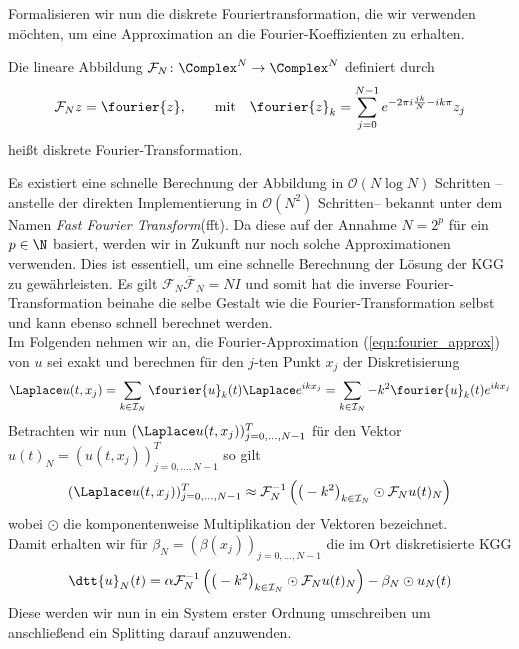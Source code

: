 Formalisieren wir nun die diskrete Fouriertransformation, die wir verwenden möchten, um eine Approximation an die Fourier-Koeffizienten zu erhalten.
\begin{mathdef}
Die lineare Abbildung $\mathcal{F}_N\colon\Complex^N\to\Complex^N$ definiert durch
\[\mathcal{F}_Nz=\fourier{z},\qquad\text{mit}\quad \fourier{z}_k=\sum_{j=0}^{N-1}e^{-2\pi i\frac{jk}{N}-ik\pi}z_j\]
heißt diskrete Fourier-Transformation.
\end{mathdef}
Es existiert eine schnelle Berechnung der Abbildung in $\mathcal{O}(N\log N)$ Schritten --anstelle der direkten Implementierung in $\mathcal{O}(N^2)$ Schritten-- bekannt unter dem Namen \emph{Fast Fourier Transform}(fft). Da diese auf der Annahme $N=2^p$ für ein $p\in\N$ basiert, werden wir in Zukunft nur noch solche Approximationen verwenden. Dies ist essentiell, um eine schnelle Berechnung der Lösung der KGG zu gewährleisten. Es gilt $\mathcal{F}_N\overline{\mathcal{F}}_N=NI$ und somit hat die inverse Fourier-Transformation beinahe die selbe Gestalt wie die Fourier-Transformation selbst und kann ebenso schnell berechnet werden.\\
Im Folgenden nehmen wir an, die Fourier-Approximation (\ref{eqn:fourier_approx}) von $u$ sei exakt und berechnen für den $j$-ten Punkt $x_j$ der Diskretisierung
\begin{equation}
\label{eqn:laplace_approxu}
\Laplace u(t,x_j)=\sum_{k\in\mathcal{I}_N}\fourier{u}_k(t)\Laplace e^{ikx_j}=\sum_{k\in\mathcal{I}_N}-k^2\fourier{u}_k(t)e^{ikx_j}
\end{equation}
Betrachten wir nun $(\Laplace u(t,x_j))_{j=0,\dots,N-1}^T$ für den Vektor $u(t)_N=(u(t,x_j))_{j=0,\dots,N-1}^T$ so gilt
\[(\Laplace u(t,x_j))_{j=0,\dots,N-1}^T\approx \mathcal{F}_N^{-1}\left(\big(-k^2\big)_{k\in\mathcal{I}_N}\odot\mathcal{F}_Nu(t)_N\right)\]
wobei $\odot$ die komponentenweise Multiplikation der Vektoren bezeichnet.\\
Damit erhalten wir für $\beta_N=(\beta(x_j))_{j=0,\dots,N-1}$ die im Ort diskretisierte KGG
\begin{equation}
\label{eqn:kgg_discretespace}
\dtt{u}_N(t)=\alpha \mathcal{F}_N^{-1}\left(\big(-k^2\big)_{k\in\mathcal{I}_N}\odot\mathcal{F}_Nu(t)_N\right) -\beta_N\odot u_N(t)
\end{equation}
Diese werden wir nun in ein System erster Ordnung umschreiben um anschließend ein Splitting darauf anzuwenden. 

